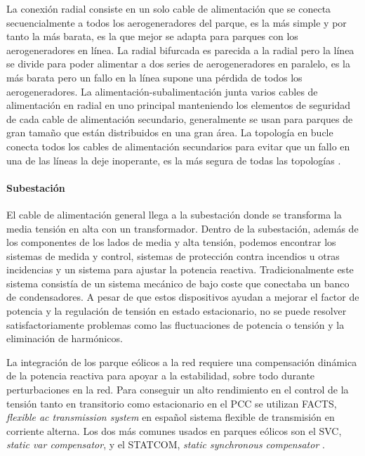 \documentclass{book}
\begin{document}
La conexi\'on radial consiste en un solo cable de alimentaci\'on que se conecta secuencialmente a todos los aerogeneradores del parque, es la m\'as simple y por tanto la m\'as barata, es la que mejor se adapta para parques con los aerogeneradores en l\'inea. La radial bifurcada es parecida a la radial pero la l\'inea se divide para poder alimentar a dos series de aerogeneradores en paralelo, es la m\'as barata pero un fallo en la l\'inea supone una p\'erdida de todos los aerogeneradores. La alimentaci\'on-subalimentaci\'on junta varios cables de alimentaci\'on en radial en uno principal manteniendo los elementos de seguridad de cada cable de alimentaci\'on secundario, generalmente se usan para parques de gran tamaño que est\'an distribuidos en una gran \'area. La topolog\'ia en bucle conecta todos los cables de alimentaci\'on secundarios para evitar que un fallo en una de las l\'ineas la deje inoperante, es la m\'as segura de todas las topolog\'ias \cite{ComunicationTopologies}.\par
		\paragraph {Subestaci\'on}
El cable de alimentaci\'on general llega a la subestaci\'on donde se transforma la media tensi\'on en alta con un transformador. Dentro de la subestaci\'on, adem\'as de los componentes de los lados de media y alta tensi\'on, podemos encontrar los sistemas de medida y control, sistemas de protecci\'on contra incendios u otras incidencias y un sistema para ajustar la potencia reactiva. Tradicionalmente este sistema consist\'ia de un sistema mec\'anico de bajo coste que conectaba un banco de condensadores. A pesar de que estos dispositivos ayudan a mejorar el factor de potencia y la regulaci\'on de tensi\'on en estado estacionario, no se puede resolver satisfactoriamente problemas como las fluctuaciones de potencia o tensi\'on y la eliminaci\'on de harm\'onicos. \par

La integraci\'on de los parque e\'olicos a la red requiere una compensaci\'on din\'amica de la potencia reactiva para apoyar a la estabilidad, sobre todo durante perturbaciones en la red. Para conseguir un alto rendimiento en el control de la tensi\'on tanto en transitorio como estacionario en el PCC se utilizan FACTS, \emph{flexible ac transmission system} en español sistema flexible de transmisi\'on en corriente alterna. Los dos m\'as comunes usados en parques e\'olicos son el SVC, \emph{static var compensator}, y el STATCOM, \emph{static synchronous compensator} \cite{FACTS}.  \par
\end{document}
